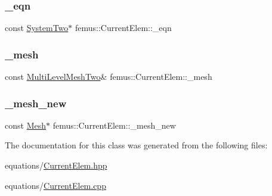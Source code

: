 \subsubsection{\texorpdfstring{\+\_\+eqn}{\_eqn}}
{\footnotesize\ttfamily const \mbox{\hyperlink{classfemus_1_1_system_two}{System\+Two}}$\ast$ femus\+::\+Current\+Elem\+::\+\_\+eqn}

\mbox{\label{classfemus_1_1_current_elem_a8321beae2ca94fa4ea8d17e484d978ee}} 
\subsubsection{\texorpdfstring{\+\_\+mesh}{\_mesh}}
{\footnotesize\ttfamily const \mbox{\hyperlink{classfemus_1_1_multi_level_mesh_two}{Multi\+Level\+Mesh\+Two}}\& femus\+::\+Current\+Elem\+::\+\_\+mesh}

\mbox{\label{classfemus_1_1_current_elem_a35f92400742999016814725c65cf2aae}} 
\subsubsection{\texorpdfstring{\+\_\+mesh\+\_\+new}{\_mesh\_new}}
{\footnotesize\ttfamily const \mbox{\hyperlink{classfemus_1_1_mesh}{Mesh}}$\ast$ femus\+::\+Current\+Elem\+::\+\_\+mesh\+\_\+new}



The documentation for this class was generated from the following files\+:\begin{DoxyCompactItemize}
\item 
equations/\mbox{\hyperlink{_current_elem_8hpp}{Current\+Elem.\+hpp}}\item 
equations/\mbox{\hyperlink{_current_elem_8cpp}{Current\+Elem.\+cpp}}\end{DoxyCompactItemize}
